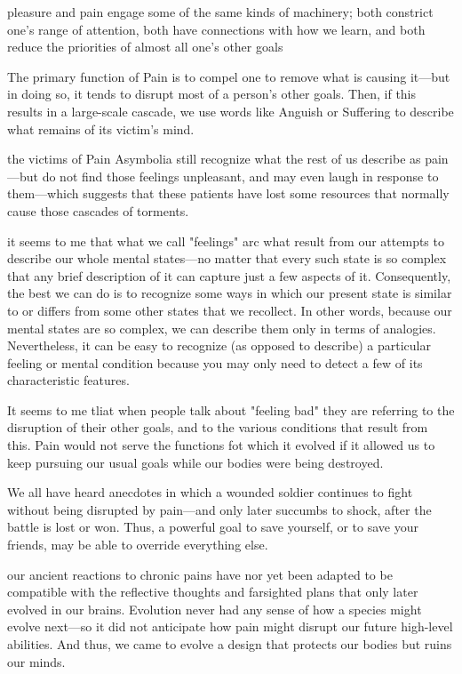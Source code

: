 \documentclass[10pt,a4paper]{article}
\begin{document}
pleasure and pain engage some of the same kinds of machinery; both constrict one's range of attention, both have connections with how we learn, and both reduce the priorities of almost all one's other goals \cite[p.~68]{minsky}

The primary function of Pain is to compel one to remove what is causing it—but in doing so, it tends to disrupt most of a person's other goals. Then, if this results in a large-scale cascade, we use words like Anguish or Suffering to describe what remains of its victim's mind. \cite[p.~70]{minsky}

the victims of Pain Asymbolia still recognize what the rest of us describe as pain—but do not find those feelings unpleasant, and may even laugh in response to them—which suggests that these patients have lost some resources that normally cause those cascades of torments. \cite[p.~72-73]{minsky}

it seems to me that what we call "feelings" arc what result from our attempts to describe our whole mental states—no matter that every such state is so complex that any brief description of it can capture just a few aspects of it. Consequently, the best we can do is to recognize some ways in which our present state is similar to or differs from some other states that we recollect. In other words, because our mental states are so complex, we can describe them only in terms of analogies. Nevertheless, it can be easy to recognize (as opposed to describe) a particular feeling or mental condition because you may only need to detect a few of its characteristic features. \cite[p.~74]{minsky}

It seems to me tliat when people talk about "feeling bad" they are referring to the disruption of their other goals, and to the various conditions that result from this. Pain would not serve the functions fot which it evolved if it allowed us to keep pursuing our usual goals while our bodies were being destroyed. \cite[p.~75]{minsky}

We all have heard anecdotes in which a wounded soldier continues to fight without being disrupted by pain—and only later succumbs to shock, after the battle is lost or won. Thus, a powerful goal to save yourself, or to save your friends, may be able to override everything else. \cite[p.~76-77]{minsky}

our ancient reactions to chronic pains have nor yet been adapted to be compatible with the reflective thoughts and farsighted plans that only later evolved in our brains. Evolution never had any sense of how a species might evolve next—so it did not anticipate how pain might disrupt our future high-level abilities. And thus, we came to evolve a design that protects our bodies but ruins our minds. \cite[p.~79]{minsky}
\end{document}
